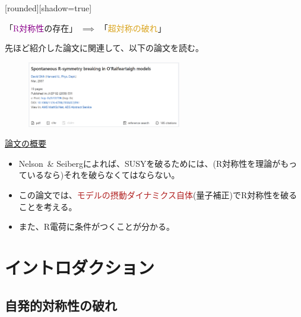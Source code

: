 \documentclass[
  unicode,a4paper,9pt,
  xcolor = {dvipsnames,svgnames},
  hyperref ={colorlinks=true,citecolor=Navy,linkcolor=NavyBlue,urlcolor=purple},
  ja=standard,lualatex
]{beamer}
\begin{document}
\begin{frame}
  [rounded][shadow=true]
  \begin{block}{}
    \centering
    「\textcolor{DarkMagenta}{R対称性}の存在」
    $\implies$
    「\textcolor{Goldenrod}{超対称の破れ}」
  \end{block}

  先ほど紹介した論文に関連して、以下の論文を読む\cite{Shih:2007av}。

  \begin{figure}
    \centering
    \includegraphics[width=0.6\textwidth]{fig/Shih2007av.PNG}
  \end{figure}

  \uline{論文の概要}

  \begin{itemize}
    \item
          Nelson\ \& Seibergによれば、SUSYを破るためには、(R対称性を理論がもっているなら)それを破らなくてはならない。
    \item
          この論文では、\textcolor{FireBrick}{モデルの摂動ダイナミクス自体}(量子補正)でR対称性を破ることを考える。
    \item
          また、R電荷に条件がつくことが分かる。
  \end{itemize}

\end{frame}


\section{イントロダクション}

\begin{frame}[plain]
  \huge \secname
\end{frame}


\subsection{自発的対称性の破れ}
\end{document}
